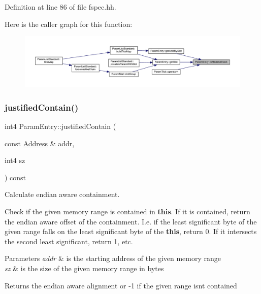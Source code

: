 Definition at line 86 of file fspec.\+hh.

Here is the caller graph for this function\+:
\nopagebreak
\begin{figure}[H]
\begin{center}
\leavevmode
\includegraphics[width=350pt]{class_param_entry_a9bacf2dac015159e70a62bb611abe0f4_icgraph}
\end{center}
\end{figure}
\mbox{\label{class_param_entry_ad2394315fdaceeb41f3b67f31f0ef01e}} 
\subsubsection{\texorpdfstring{justifiedContain()}{justifiedContain()}}
{\footnotesize\ttfamily int4 Param\+Entry\+::justified\+Contain (\begin{DoxyParamCaption}\item[{const \mbox{\hyperlink{class_address}{Address}} \&}]{addr,  }\item[{int4}]{sz }\end{DoxyParamCaption}) const}



Calculate endian aware containment. 

Check if the given memory range is contained in {\bfseries{this}}. If it is contained, return the endian aware offset of the containment. I.\+e. if the least significant byte of the given range falls on the least significant byte of the {\bfseries{this}}, return 0. If it intersects the second least significant, return 1, etc. 
\begin{DoxyParams}{Parameters}
{\em addr} & is the starting address of the given memory range \\
\hline
{\em sz} & is the size of the given memory range in bytes \\
\hline
\end{DoxyParams}
\begin{DoxyReturn}{Returns}
the endian aware alignment or -\/1 if the given range isn\textquotesingle{}t contained 
\end{DoxyReturn}


